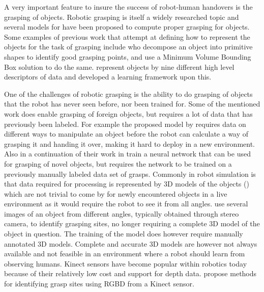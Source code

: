 A very important feature to insure the success of robot-human handovers is the grasping of objects. Robotic grasping is itself a widely researched topic and several models for have been proposed to compute proper grasping for objects. Some examples of previous work that attempt at defining how to represent the objects for the task of grasping include \textcite{Miller2003} who decompose an object into primitive shapes to identify good grasping points, and \textcite{Huebner2008} use a Minimum Volume Bounding Box solution to do the same. \textcite{Morales} represent objects by nine different high level descriptors of data and developed a learning framework upon this.

One of the challenges of robotic grasping is the ability to do grasping of objects that the robot has never seen before, nor been trained for. Some of the mentioned work does enable grasping of foreign objects, but requires a lot of data that has previously been labeled. For example the proposed model by \textcite{Chan2014} requires data on different ways to manipulate an object before the robot can calculate a way of grasping it and handing it over, making it hard to deploy in a new environment. Also \textcite{Huebner2008a} in a continuation of their work in \parencite{Huebner2008} train a neural network that can be used for grasping of novel objects, but requires the network to be trained on a previously manually labeled data set of grasps. Commonly in robot simulation is that data required for processing is represented by 3D models of the objects (\parencite{Miller2003}) which are not trivial to come by for newly encountered objects in a live environment as it would require the robot to see it from all angles. \textcite{Saxena2008} use several images of an object from different angles, typically obtained through stereo camera, to identify grasping sites, no longer requiring a complete 3D model of the object in question. The training of the model does however require manually annotated 3D models. Complete and accurate 3D models are however not always available and not feasible in an environment where a robot should learn from observing humans. Kinect sensors have become popular within robotics today because of their relatively low cost and support for depth data. \parencite{Lenz2015} \parencite{Redmon2014} \parencite{Jiang2011} propose methods for identifying grasp sites using RGBD from a Kinect sensor.

